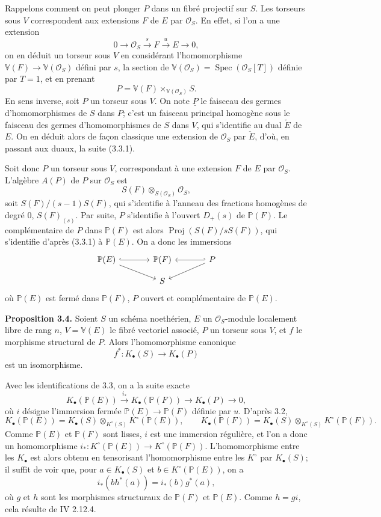 \documentclass[11pt]{article}
\newcommand{\Spec}{\operatorname{Spec}}
\begin{document}
Rappelons comment on peut plonger $P$ dans un fibré projectif sur $S$. Les torseurs sous $V$ correspondent aux extensions $F$ de $E$ par $\mathcal O_S$. En effet, si l'on a une extension
\[
0\longrightarrow \mathcal O_S\xrightarrow{s}F\xrightarrow{u}E\longrightarrow 0,
\tag{3.3.1}
\]
on en déduit un torseur sous $V$ en considérant l'homomorphisme $\mathbb V(F)\to \mathbb V(\mathcal O_S)$ défini par $s$, la section de $\mathbb V(\mathcal O_S)=\Spec(\mathcal O_S[T])$ définie par $T=1$, et en prenant
\[
P=\mathbb V(F)\times_{\mathbb V(\mathcal O_S)}S.
\]
En sens inverse, soit $P$ un torseur sous $V$. On note $\underline P$ le faisceau des germes d'homomorphismes de $S$ dans $P$; c'est un faisceau principal homogène sous le faisceau des germes d'homomorphismes de $S$ dans $V$, qui s'identifie au dual $\check E$ de $E$. On en déduit alors de façon classique une extension de $\mathcal O_S$ par $\check E$, d'où, en passant aux duaux, la suite (3.3.1).

Soit donc $P$ un torseur sous $V$, correspondant à une extension $F$ de $E$ par $\mathcal O_S$. L'algèbre $A(P)$ de $P$ sur $\mathcal O_S$ est
\[
S(F)\otimes_{S(\mathcal O_S)}\mathcal O_S,
\]
soit $S(F)/(s-1)S(F)$, qui s'identifie à l'anneau des fractions homogènes de degré $0$, $S(F)_{(s)}$. Par suite, $P$ s'identifie à l'ouvert $D_+(s)$ de $\mathbb P(F)$. Le complémentaire de $P$ dans $\mathbb P(F)$ est alors $\operatorname{Proj}(S(F)/sS(F))$, qui s'identifie d'après (3.3.1) à $\mathbb P(E)$. On a donc les immersions
\[
\begin{tikzcd}[column sep=large,row sep=small]
\mathbb P(E) \arrow[r,hook] \arrow[dr] & \mathbb P(F) & P \arrow[l,hook'] \arrow[dl]\\
& S &
\end{tikzcd}
\]
où $\mathbb P(E)$ est fermé dans $\mathbb P(F)$, $P$ ouvert et complémentaire de $\mathbb P(E)$.

\textbf{Proposition 3.4.} Soient $S$ un schéma noethérien, $E$ un $\mathcal O_S$-module localement libre de rang $n$, $V=\mathbb V(E)$ le fibré vectoriel associé, $P$ un torseur sous $V$, et $f$ le morphisme structural de $P$. Alors l'homomorphisme canonique
\[
f^*:K_\bullet(S)\longrightarrow K_\bullet(P)
\]
est un isomorphisme.

Avec les identifications de 3.3, on a la suite exacte
\[
K_\bullet(\mathbb P(E))\xrightarrow{i_*}K_\bullet(\mathbb P(F))\longrightarrow K_\bullet(P)\longrightarrow 0,
\tag{3.4.1}
\]
où $i$ désigne l'immersion fermée $\mathbb P(E)\to \mathbb P(F)$ définie par $u$. D'après 3.2,
\[
K_\bullet(\mathbb P(E))=K_\bullet(S)\otimes_{K^\circ(S)}K^\circ(\mathbb P(E)),\qquad
K_\bullet(\mathbb P(F))=K_\bullet(S)\otimes_{K^\circ(S)}K^\circ(\mathbb P(F)).
\]
Comme $\mathbb P(E)$ et $\mathbb P(F)$ sont lisses, $i$ est une immersion régulière, et l'on a donc un homomorphisme $i_*:K^\circ(\mathbb P(E))\to K^\circ(\mathbb P(F))$. L'homomorphisme entre les $K_\bullet$ est alors obtenu en tensorisant l'homomorphisme entre les $K^\circ$ par $K_\bullet(S)$; il suffit de voir que, pour $a\in K_\bullet(S)$ et $b\in K^\circ(\mathbb P(E))$, on a
\[
i_*(b h^*(a))=i_*(b)g^*(a),
\]
où $g$ et $h$ sont les morphismes structuraux de $\mathbb P(F)$ et $\mathbb P(E)$. Comme $h=gi$, cela résulte de IV 2.12.4.
\end{document}

